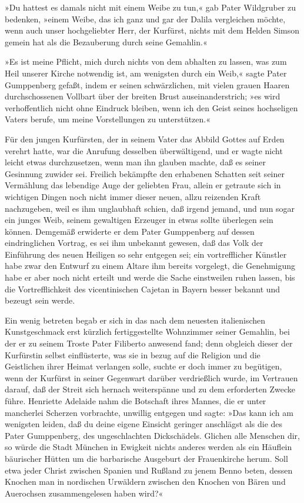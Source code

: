 »Du hattest es damals nicht mit einem Weibe zu tun,« gab Pater
Wildgruber zu bedenken, »einem Weibe, das ich ganz und gar der
Dalila vergleichen möchte, wenn auch unser hochgeliebter Herr, der
Kurfürst, nichts mit dem Helden Simson gemein hat als die
Bezauberung durch seine Gemahlin.«

»Es ist meine Pflicht, mich durch nichts von dem abhalten zu
lassen, was zum Heil unserer Kirche notwendig ist, am wenigsten
durch ein Weib,« sagte Pater Gumppenberg gefaßt, indem er seinen
schwärzlichen, mit vielen grauen Haaren durchschossenen Vollbart
über der breiten Brust auseinanderstrich; »es wird verhoffentlich
nicht ohne Eindruck bleiben, wenn ich den Geist seines hochseligen
Vaters berufe, um meine Vorstellungen zu unterstützen.«

Für den jungen Kurfürsten, der in seinem Vater das Abbild Gottes
auf Erden verehrt hatte, war die Anrufung desselben überwältigend,
und er wagte nicht leicht etwas durchzusetzen, wenn man ihn glauben
machte, daß es seiner Gesinnung zuwider sei. Freilich bekämpfte den
erhabenen Schatten seit seiner Vermählung das lebendige Auge der
geliebten Frau, allein er getraute sich in wichtigen Dingen noch
nicht immer dieser neuen, allzu reizenden Kraft nachzugeben, weil
es ihm unglaubhaft schien, daß irgend jemand, und nun sogar ein
junges Weib, seinem gewaltigen Erzeuger in etwas sollte überlegen
sein können. Demgemäß erwiderte er dem Pater Gumppenberg auf dessen
eindringlichen Vortrag, es sei ihm unbekannt gewesen, daß das Volk
der Einführung des neuen Heiligen so sehr entgegen sei; ein
vortrefflicher Künstler habe zwar den Entwurf zu einem Altare ihm
bereits vorgelegt, die Genehmigung habe er aber noch \pagenum{[99]}
nicht erteilt und werde die Sache einstweilen ruhen lassen, bis die
Vortrefflichkeit des vicentinischen Cajetan in Bayern besser
bekannt und bezeugt sein werde.

Ein wenig betreten begab er sich in das nach dem neuesten
italienischen Kunstgeschmack erst kürzlich fertiggestellte
Wohnzimmer seiner Gemahlin, bei der er zu seinem Troste Pater
Filiberto anwesend fand; denn obgleich dieser der Kurfürstin selbst
einflüsterte, was sie in bezug auf die Religion und die Geistlichen
ihrer Heimat verlangen solle, suchte er doch immer zu begütigen,
wenn der Kurfürst in seiner Gegenwart darüber verdrießlich wurde,
im Vertrauen darauf, daß der Streit sich hernach weiterspänne und
zu dem erforderten Zwecke führe. Henriette Adelaide nahm die
Botschaft ihres Mannes, die er unter mancherlei Scherzen
vorbrachte, unwillig entgegen und sagte: »Das kann ich am wenigsten
leiden, daß du deine eigene Einsicht geringer anschlägst als die
des Pater Gumppenberg, des ungeschlachten Dickschädels. Glichen
alle Menschen dir, so würde die Stadt München in Ewigkeit nichts
anderes werden als ein Häuflein bäurischer Hütten um die
barbarische Ausgeburt der Frauenkirche herum. Soll etwa jeder
Christ zwischen Spanien und Rußland zu jenem Benno beten, dessen
Knochen man in nordischen Urwäldern zwischen den Knochen von Bären
und Auerochsen zusammengelesen haben wird?«

